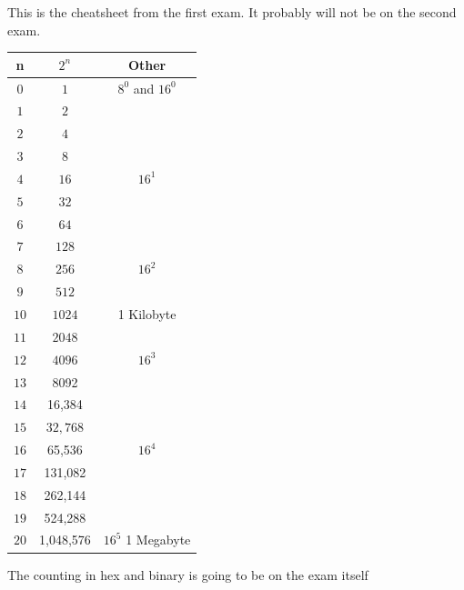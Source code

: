 \documentclass[letterpaper,12pt]{exam}
\begin{document}
\newpage
\twocolumn
This is the cheatsheet from the first exam.  It probably will not be on the second exam.
\begin{center}
\begin{tabular}{| c | c | c |}
    \hline
        n & $2^n$ & Other \\
        \hline
    $0$ & $ 1 $ & $8^0$ and $16^0$ \\ 
    $1$ & $ 2 $ & \  \\ 
\hline
    $2$ & $ 4 $ & \  \\ 
    $3$ & $ 8 $ & \  \\ 
\hline
    $4$ & $ 16 $ & $16^1$ \\ 
    $5$ & $ 32 $ & \  \\ 
\hline
    $6$ & $ 64 $ & \  \\ 
    $7$ & $ 128 $ & \  \\ 
\hline
    $8$ & $ 256 $ & $16^2$ \\ 
    $9$ & $ 512 $ & \  \\ 
\hline
    $10$ & $ 1024 $ & 1 Kilobyte \\ 
    $11$ & $ 2048 $ & \  \\ 
\hline
    $12$ & $ 4096 $ & $16^3$ \\ 
    $13$ & {\color{lightgray}  8092}  & \  \\ 
\hline
    $14$ &  {\color{lightgray}  16,384} & \  \\ 
    $15$ & $ 32,768 $ & \  \\ 
\hline
    $16$ &   65,536  & $16^4$ \\ 
    $17$ & {\color{lightgray} 131,082 } & \  \\ 
\hline
      $18$ &   {\color{lightgray}  262,144} & \  \\ 
    $19$ &  {\color{lightgray} 524,288 } & \  \\ 
\hline
      $20$ & 1,048,576  & $16^5$ 1 Megabyte \\  
\hline
    \end{tabular}
\end{center}
\par
\begin{center}
The counting in hex and binary is going to be on the exam itself
\end{center}
\end{document}
